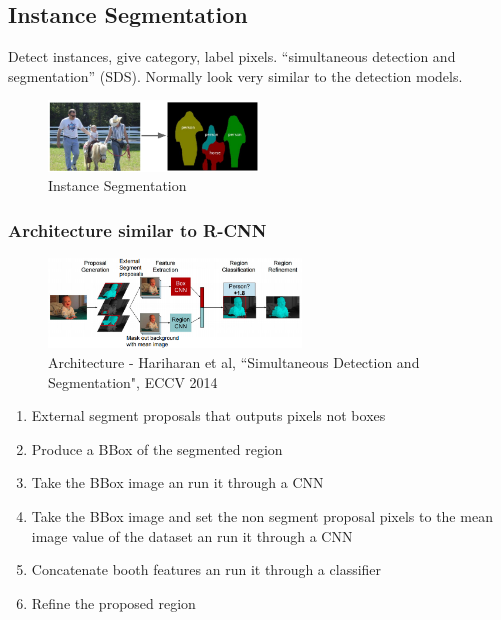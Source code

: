 \subsection{Instance Segmentation}

Detect instances, give category, label pixels. “simultaneous detection and segmentation” (SDS). Normally look very similar to the detection models.

\begin{figure}[h]
  \centering
  \includegraphics[width=0.5\textwidth]{Images/applications/19.png}
  \caption{Instance Segmentation}
\end{figure}

\subsubsection*{Architecture similar to R-CNN}

\begin{figure}[h]
  \centering
  \includegraphics[width=0.6\textwidth]{Images/applications/20.png}
  \caption{Architecture - Hariharan et al, ``Simultaneous Detection and Segmentation", ECCV 2014}
\end{figure}

\begin{enumerate}
\item External segment proposals that outputs pixels not boxes
\item Produce a BBox of the segmented region
\item Take the BBox image an run it through a CNN
\item Take the BBox image and set the non segment proposal pixels to the mean image value of the dataset an run it through a CNN
\item Concatenate booth features an run it through a classifier
\item Refine the proposed region
\end{enumerate}

